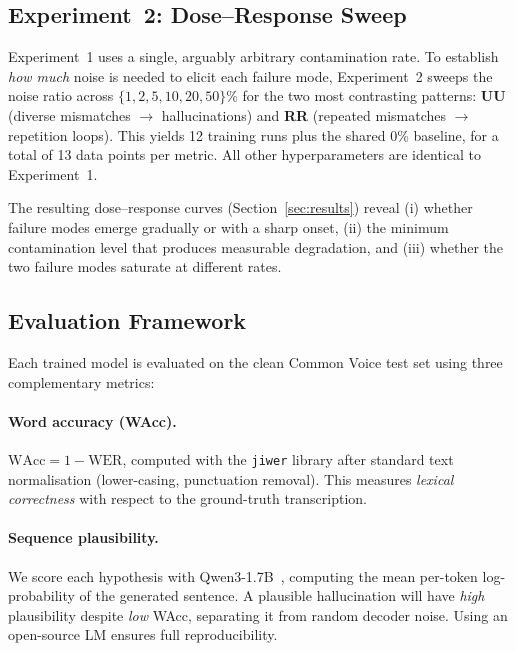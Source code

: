 \subsection{Experiment~2: Dose--Response Sweep}
\label{sec:exp2}

Experiment~1 uses a single, arguably arbitrary contamination rate.
To establish \emph{how much} noise is needed to elicit each failure mode,
Experiment~2 sweeps the noise ratio across
$\{1, 2, 5, 10, 20, 50\}\%$
for the two most contrasting patterns: \textbf{UU} (diverse mismatches
$\to$ hallucinations) and \textbf{RR} (repeated mismatches $\to$
repetition loops).
This yields 12 training runs plus the shared 0\% baseline, for a total
of 13 data points per metric.
All other hyperparameters are identical to Experiment~1.

The resulting dose--response curves (Section~\ref{sec:results}) reveal
(i) whether failure modes emerge gradually or with a sharp onset,
(ii) the minimum contamination level that produces measurable degradation,
and (iii) whether the two failure modes saturate at different rates.

\subsection{Evaluation Framework}
\label{sec:eval}

Each trained model is evaluated on the clean Common Voice test set using
three complementary metrics:

\paragraph{Word accuracy (WAcc).}
$\mathrm{WAcc} = 1 - \mathrm{WER}$, computed with the \texttt{jiwer}
library after standard text normalisation (lower-casing, punctuation removal).
This measures \emph{lexical correctness} with respect to the ground-truth
transcription.

\paragraph{Sequence plausibility.}
We score each hypothesis with Qwen3-1.7B~\cite{qwen3}, computing the
mean per-token log-probability of the generated sentence.
A plausible hallucination will have \emph{high} plausibility despite
\emph{low} WAcc, separating it from random decoder noise.
Using an open-source LM ensures full reproducibility.

